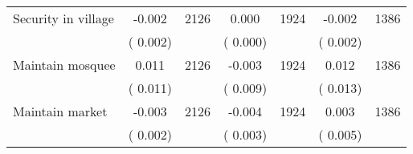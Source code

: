 \begin{tabular}{l*{6}{c}}
Security in village        &             -0.002      &       2126       &              0.000      &       1924       &             -0.002      &       1386       \\
                       &       (       0.002)            &                               &       (       0.000)            &                               &       (       0.002)            &                               \\
Maintain mosquee        &              0.011      &       2126       &             -0.003      &       1924       &              0.012      &       1386       \\
                       &       (       0.011)            &                               &       (       0.009)            &                               &       (       0.013)            &                               \\
Maintain market        &             -0.003      &       2126       &             -0.004      &       1924       &              0.003      &       1386       \\
                       &       (       0.002)            &                               &       (       0.003)            &                               &       (       0.005)            &                               \\
\hline \end{tabular}